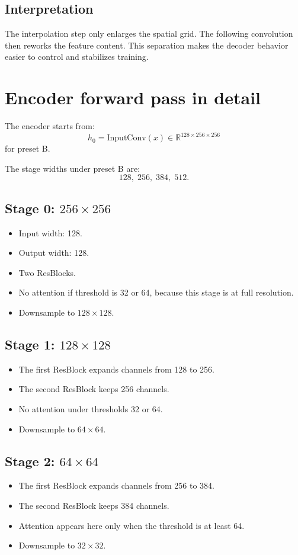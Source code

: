 \documentclass[11pt]{article}
\begin{document}
\subsection{Interpretation}
The interpolation step only enlarges the spatial grid. The following convolution then reworks the feature content.
This separation makes the decoder behavior easier to control and stabilizes training.

\section{Encoder forward pass in detail}
The encoder starts from:
\[
h_0 = \mathrm{InputConv}(x) \in \mathbb{R}^{128 \times 256 \times 256}
\]
for preset B.

The stage widths under preset B are:
\[
128,\;256,\;384,\;512.
\]

\subsection{Stage 0: $256 \times 256$}
\begin{itemize}
  \item Input width: 128.
  \item Output width: 128.
  \item Two ResBlocks.
  \item No attention if threshold is 32 or 64, because this stage is at full resolution.
  \item Downsample to $128 \times 128$.
\end{itemize}

\subsection{Stage 1: $128 \times 128$}
\begin{itemize}
  \item The first ResBlock expands channels from 128 to 256.
  \item The second ResBlock keeps 256 channels.
  \item No attention under thresholds 32 or 64.
  \item Downsample to $64 \times 64$.
\end{itemize}

\subsection{Stage 2: $64 \times 64$}
\begin{itemize}
  \item The first ResBlock expands channels from 256 to 384.
  \item The second ResBlock keeps 384 channels.
  \item Attention appears here only when the threshold is at least 64.
  \item Downsample to $32 \times 32$.
\end{itemize}
\end{document}
